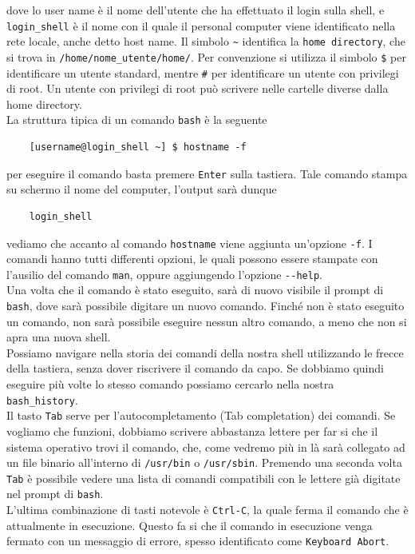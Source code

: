 dove lo user name è il nome dell'utente che ha effettuato il login sulla shell, e \verb"login_shell" è il nome con il quale il personal computer viene identificato nella rete locale, anche detto host name. Il simbolo \verb"~" identifica la \verb"home directory", che si trova in \verb"/home/nome_utente/home/". Per convenzione si utilizza il simbolo \verb"$" per identificare un utente standard, mentre \verb"#" per identificare un utente con privilegi di root. Un utente con privilegi di root può scrivere nelle cartelle diverse dalla home directory.\\
La struttura tipica di un comando \verb"bash" è la seguente
\begin{verbatim}
	[username@login_shell ~] $ hostname -f
\end{verbatim}
per eseguire il comando basta premere \verb"Enter" sulla tastiera. Tale comando stampa su schermo il nome del computer, l'output sarà dunque
\begin{verbatim}
	login_shell
\end{verbatim}
vediamo che accanto al comando \verb"hostname" viene aggiunta un'opzione \verb"-f". I comandi hanno tutti differenti opzioni, le quali possono essere stampate con l'ausilio del comando \verb"man", oppure aggiungendo l'opzione \verb"--help".\\
Una volta che il comando è stato eseguito, sarà di nuovo visibile il prompt di \verb"bash", dove sarà possibile digitare un nuovo comando. Finché non è stato eseguito un comando, non sarà possibile eseguire nessun altro comando, a meno che non si apra una nuova shell.\\
Possiamo navigare nella storia dei comandi della nostra shell utilizzando le frecce della tastiera, senza dover riscrivere il comando da capo. Se dobbiamo quindi eseguire più volte lo stesso comando possiamo cercarlo nella nostra \verb"bash_history".\\
Il tasto \verb"Tab" serve per l'autocompletamento (Tab completation) dei comandi. Se vogliamo che funzioni, dobbiamo scrivere abbastanza lettere per far si che il sistema operativo trovi il comando, che, come vedremo più in là sarà collegato ad un file binario all'interno di \verb"/usr/bin" o \verb"/usr/sbin". Premendo una seconda volta \verb"Tab" è possibile vedere una lista di comandi compatibili con le lettere già digitate nel prompt di \verb"bash". \\
L'ultima combinazione di tasti notevole è \verb"Ctrl-C", la quale ferma il comando che è attualmente in esecuzione. Questo fa si che il comando in esecuzione venga fermato con un messaggio di errore, spesso identificato come \verb"Keyboard Abort". \\
